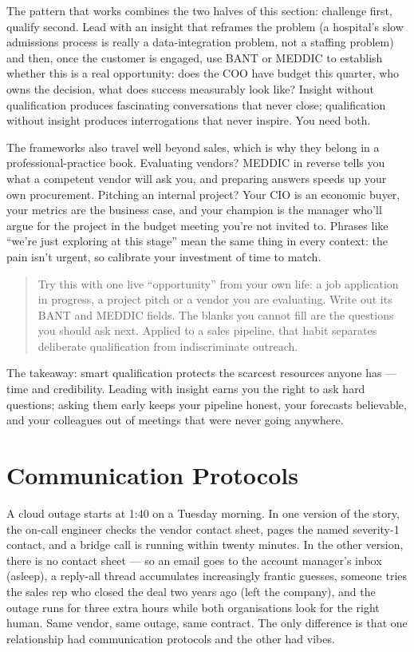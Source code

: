 The pattern that works combines the two halves of this section: challenge first, qualify second. Lead with an insight that reframes the problem (a hospital's slow admissions process is really a data-integration problem, not a staffing problem) and then, once the customer is engaged, use BANT or MEDDIC to establish whether this is a real opportunity: does the COO have budget this quarter, who owns the decision, what does success measurably look like? Insight without qualification produces fascinating conversations that never close; qualification without insight produces interrogations that never inspire. You need both.


The frameworks also travel well beyond sales, which is why they belong in a professional-practice book. Evaluating vendors? MEDDIC in reverse tells you what a competent vendor will ask you, and preparing answers speeds up your own procurement. Pitching an internal project? Your CIO is an economic buyer, your metrics are the business case, and your champion is the manager who'll argue for the project in the budget meeting you're not invited to. Phrases like ``we're just exploring at this stage'' mean the same thing in every context: the pain isn't urgent, so calibrate your investment of time to match.



\begin{quote}\small
Try this with one live ``opportunity'' from your own life: a job application in progress, a project pitch or a vendor you are evaluating. Write out its BANT and MEDDIC fields. The blanks you cannot fill are the questions you should ask next. Applied to a sales pipeline, that habit separates deliberate qualification from indiscriminate outreach.
\end{quote}


The takeaway: smart qualification protects the scarcest resources anyone has — time and credibility. Leading with insight earns you the right to ask hard questions; asking them early keeps your pipeline honest, your forecasts believable, and your colleagues out of meetings that were never going anywhere.

\section{Communication Protocols}
A cloud outage starts at 1:40 on a Tuesday morning. In one version of the story, the on-call engineer checks the vendor contact sheet, pages the named severity-1 contact, and a bridge call is running within twenty minutes. In the other version, there is no contact sheet — so an email goes to the account manager's inbox (asleep), a reply-all thread accumulates increasingly frantic guesses, someone tries the sales rep who closed the deal two years ago (left the company), and the outage runs for three extra hours while both organisations look for the right human. Same vendor, same outage, same contract. The only difference is that one relationship had communication protocols and the other had vibes.



